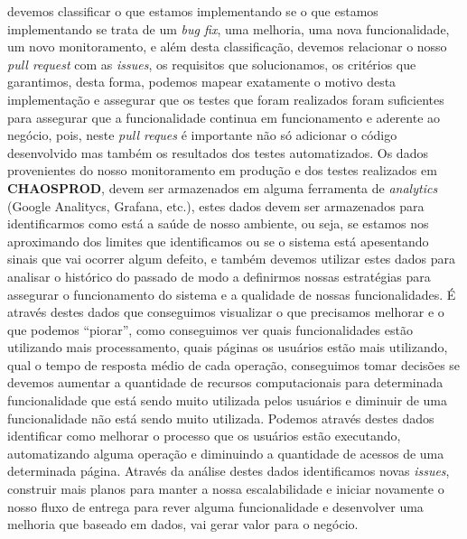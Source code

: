       devemos classificar o que estamos implementando se o que estamos implementando
      se trata de um \textit{bug fix}, uma melhoria, uma nova funcionalidade,
      um novo monitoramento, e além desta classificação, devemos relacionar
      o nosso \textit{pull request} com as \textit{issues}, os requisitos que
      solucionamos, os critérios que garantimos, desta forma, podemos mapear
      exatamente o motivo desta implementação e assegurar que os testes que
      foram realizados foram suficientes para assegurar que a funcionalidade
      continua em funcionamento e aderente ao negócio, pois, neste \textit{pull
      reques} é importante não só adicionar o código desenvolvido mas também os
      resultados dos testes automatizados. \newline
      Os dados provenientes do nosso monitoramento em produção e dos testes
      realizados em \textbf{CHAOSPROD}, devem ser armazenados em alguma ferramenta
      de \textit{analytics} (Google Analitycs, Grafana, etc.), estes dados
      devem ser armazenados para identificarmos como está a saúde de nosso
      ambiente, ou seja, se estamos nos aproximando dos limites que identificamos
      ou se o sistema está apesentando sinais que vai ocorrer algum defeito, e
      também devemos utilizar estes dados para analisar o histórico do passado
      de modo a definirmos nossas estratégias para assegurar o funcionamento do
      sistema e a qualidade de nossas funcionalidades. É através destes dados
      que conseguimos visualizar o que precisamos melhorar e o que podemos
      “piorar”, como conseguimos ver quais funcionalidades estão utilizando
      mais processamento, quais páginas os usuários estão mais utilizando, qual
      o tempo de resposta médio de cada operação, conseguimos tomar decisões
      se devemos aumentar a quantidade de recursos computacionais para determinada
      funcionalidade que está sendo muito utilizada pelos usuários e diminuir
      de uma funcionalidade não está sendo muito utilizada. Podemos através
      destes dados identificar como melhorar o processo que os usuários estão
      executando, automatizando alguma operação e diminuindo a quantidade de
      acessos de uma determinada página. Através da análise destes dados
      identificamos novas \textit{issues}, construir mais planos para manter
      a nossa escalabilidade e iniciar novamente o nosso fluxo de entrega para
      rever alguma funcionalidade e desenvolver uma melhoria que baseado em
      dados, vai gerar valor para o negócio.

